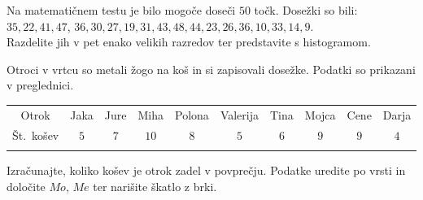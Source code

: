         


            \begin{naloga}
         
                Na matematičnem testu je bilo mogoče doseči $50$ točk. Dosežki so bili: 
                $35, 22, 41, 47$, $36, 30, 27, 19, 31, 43, 48, 44, 23, 26, 36, 10, 33, 14, 9$. \\
                Razdelite jih v pet enako velikih razredov ter predstavite s histogramom.
                
            \end{naloga}

        
            \begin{naloga}
             
             Otroci v vrtcu so metali žogo na koš in si zapisovali dosežke. Podatki so prikazani v preglednici. 

                 \begin{table}[H]
                     \centering
                     \begin{tabular}{||c|c|c|c|c|c|c|c|c|c||} 
                     \hhline{|t:==========:t|}
                     \rowcolor[rgb]{0.843,0.718,0.718} 
                     Otrok  & Jaka & Jure & Miha & Polona & Valerija & Tina & Mojca & Cene & Darja   \\ 
                     \hhline{|:==========:|}
                     Št.~košev & $5$ & $7$ & $10$ & $8$ & $5$ & $6$ & $9$ & $9$& $4$  \\ 
                     \hhline{|b:==========:b|}
                     \end{tabular}
                 \end{table}

                 Izračunajte, koliko košev je otrok zadel v povprečju. Podatke uredite po vrsti in določite $Mo$, $Me$ ter narišite škatlo z brki.

            \end{naloga}




